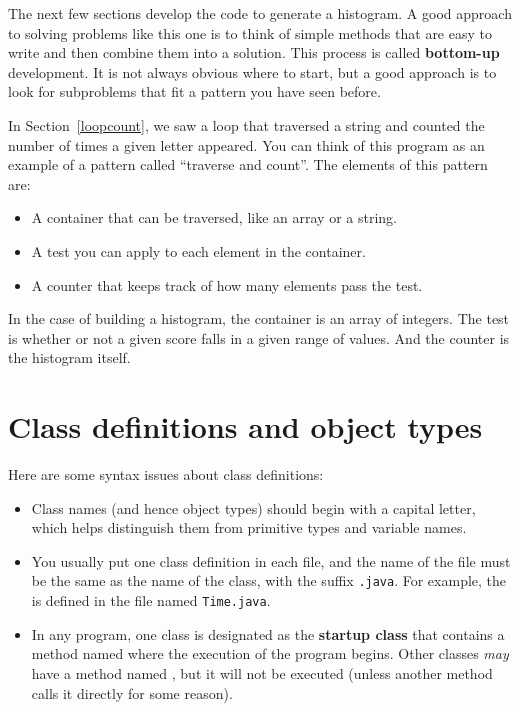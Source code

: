 
The next few sections develop the code to generate a histogram.
A good approach to solving problems like this one is to think of simple methods that are easy to write and then combine them into a solution.
This process is called {\bf bottom-up} development.
It is not always obvious where to start, but a good approach is to look for subproblems that fit a pattern you have seen before.


In Section~\ref{loopcount}, we saw a loop that traversed a string and counted the number of times a given letter appeared.
You can think of this program as an example of a pattern called ``traverse and count''.
The elements of this pattern are:

\begin{itemize}
\item A container that can be traversed, like an array or a string.
\item A test you can apply to each element in the container.
\item A counter that keeps track of how many elements pass the test.
\end{itemize}

In the case of building a histogram, the container is an array of integers.
The test is whether or not a given score falls in a given range of values.
And the counter is the histogram itself.


\section{Class definitions and object types}

Here are some syntax issues about class definitions:

\begin{itemize}

\item Class names (and hence object types) should begin with a capital letter, which helps distinguish them from primitive types and variable names.

\item You usually put one class definition in each file, and the name of the file must be the same as the name of the class, with the suffix {\tt .java}.
For example, the  is defined in the file named {\tt Time.java}.

\item In any program, one class is designated as the {\bf startup class} that contains a method named  where the execution of the program begins.
Other classes {\em may} have a method named , but it will not be executed (unless another method calls it directly for some reason).

\end{itemize}

